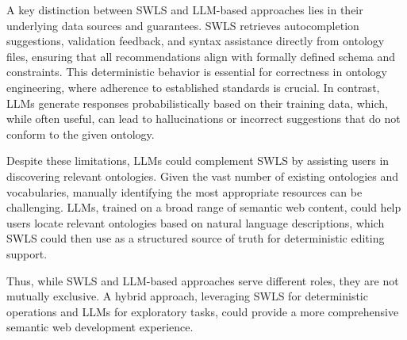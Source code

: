 A key distinction between SWLS and LLM-based approaches lies in their underlying data sources and guarantees.
SWLS retrieves autocompletion suggestions, validation feedback, and syntax assistance directly from ontology files, ensuring that all recommendations align with formally defined schema and constraints.
This deterministic behavior is essential for correctness in ontology engineering, where adherence to established standards is crucial. 
In contrast, LLMs generate responses probabilistically based on their training data, which, while often useful, can lead to hallucinations or incorrect suggestions that do not conform to the given ontology.

Despite these limitations, LLMs could complement SWLS by assisting users in discovering relevant ontologies.
Given the vast number of existing ontologies and vocabularies, manually identifying the most appropriate resources can be challenging. 
LLMs, trained on a broad range of semantic web content, could help users locate relevant ontologies based on natural language descriptions, which SWLS could then use as a structured source of truth for deterministic editing support.  

Thus, while SWLS and LLM-based approaches serve different roles, they are not mutually exclusive. 
A hybrid approach, leveraging SWLS for deterministic operations and LLMs for exploratory tasks, could provide a more comprehensive semantic web development experience.  


